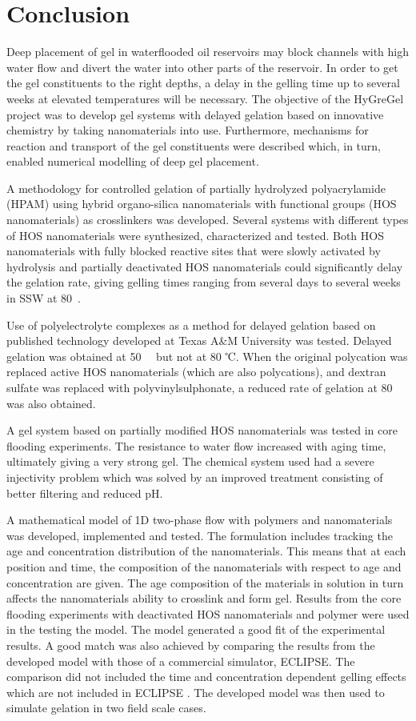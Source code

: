 \documentclass[energies,article,submit,moreauthors,pdftex]{Definitions/mdpi}
\begin{document}
\section{Conclusion}
Deep placement of gel in waterflooded oil reservoirs may block channels with high water flow and divert the water into other parts of the reservoir. In order to get the gel constituents to the right depths, a delay in the gelling time up to several weeks at elevated temperatures will be necessary. The objective of the HyGreGel project was to develop gel systems with delayed gelation based on innovative chemistry by taking nanomaterials into use. Furthermore, mechanisms for reaction and transport of the gel constituents were described which, in turn, enabled numerical modelling of deep gel placement.

A methodology for controlled gelation of partially hydrolyzed polyacrylamide (HPAM) using hybrid organo-silica nanomaterials with functional groups (HOS nanomaterials) as crosslinkers was developed. Several systems with different types of HOS nanomaterials were synthesized, characterized and tested. Both HOS nanomaterials with fully blocked reactive sites that were slowly activated by hydrolysis and partially deactivated HOS nanomaterials could significantly delay the gelation rate, giving gelling times ranging from several days to several weeks in SSW at 80~\celsius.

Use of polyelectrolyte complexes as a method for delayed gelation based on published
technology developed at Texas A\&M University was tested. Delayed gelation was obtained at 50~\celsius~ but not at 80 ℃. When the original polycation was replaced  
active HOS nanomaterials (which are also polycations), and dextran sulfate was replaced with polyvinylsulphonate, a reduced rate of gelation at 80~\celsius~ was also obtained.  

A gel system based on partially modified HOS nanomaterials was tested in core flooding experiments. The resistance to water flow increased with aging time, ultimately giving a very strong gel. The chemical system used had a severe injectivity problem which was solved by an improved treatment consisting of better filtering and reduced pH.

A mathematical model of 1D two-phase flow with polymers and nanomaterials was developed, implemented and tested. The formulation includes tracking the age and concentration distribution of the nanomaterials. This means that at each position and time, the composition of the nanomaterials with respect to age and concentration are given. The age composition of the materials in solution in turn affects the nanomaterials ability to crosslink and form gel. Results from the core flooding experiments with deactivated HOS nanomaterials and polymer were used in the testing the model. The model generated a good fit of the experimental results. A good match was also achieved by comparing the results from the developed model with those of a commercial simulator, ECLIPSE. The comparison did not included the time and concentration dependent gelling effects which are not included in ECLIPSE \cite{slb2015}.  The developed model was then used to simulate gelation in two field scale cases.
\end{document}
